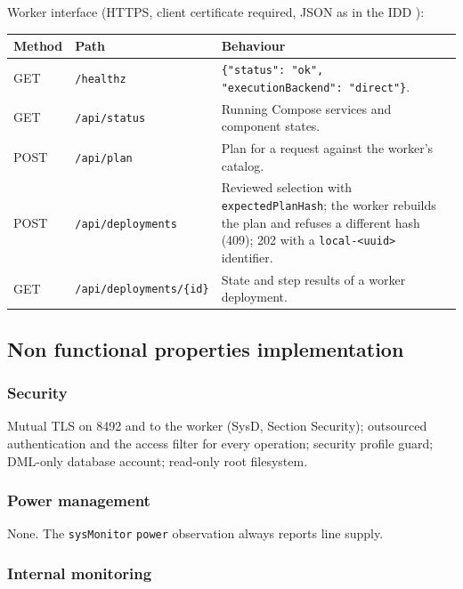 \documentclass[a4paper]{arrowhead}
\begin{document}
Worker interface (HTTPS, client certificate required, JSON as in the IDD \cite{lcc-localCloudConfiguration-http-idd}):

\noindent\begin{longtable}{| p{1.6cm} | p{5.2cm} | >{\raggedright\arraybackslash}p{8.0cm} |} \hline
\rowcolor{gray!33} Method & Path & Behaviour \\ \hline \endhead
GET & \texttt{/healthz} & \texttt{\{"status": "ok", "executionBackend": "direct"\}}. \\ \hline
GET & \texttt{/api/\allowbreak{}status} & Running Compose services and component states. \\ \hline
POST & \texttt{/api/\allowbreak{}plan} & Plan for a request against the worker's catalog. \\ \hline
POST & \texttt{/api/\allowbreak{}deployments} & Reviewed selection with \texttt{expectedPlanHash}; the worker rebuilds the plan and refuses a different hash (409); 202 with a \texttt{local-\allowbreak{}<uuid>} identifier. \\ \hline
GET & \texttt{/api/\allowbreak{}deployments/\allowbreak{}\{id\}} & State and step results of a worker deployment. \\ \hline
\end{longtable}

\subsection{Non functional properties implementation}

\subsubsection{Security}

Mutual TLS on 8492 and to the worker (SysD, Section Security); outsourced authentication and the access filter for every operation; security profile guard; DML-only database account; read-only root filesystem.

\subsubsection{Power management}

None. The \texttt{sysMonitor} \texttt{power} observation always reports line supply.

\subsubsection{Internal monitoring}
\end{document}
